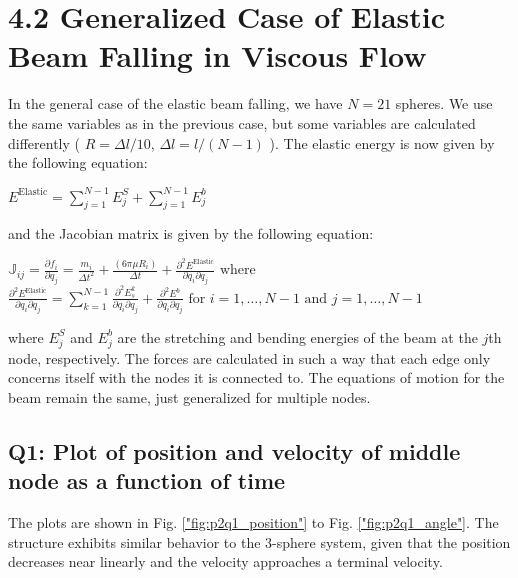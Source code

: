 \documentclass[letterpaper, 10 pt, conference]{ieeeconf}  %
\begin{document}
\section{4.2 Generalized Case of Elastic Beam Falling in Viscous Flow}

In the general case of the elastic beam falling, we have $N = 21$ spheres. We use the same variables as in the previous case, but some variables are calculated differently ( $R = \Delta l / 10$, $\Delta l = l / (N - 1)$ ). The elastic energy is now given by the following equation:

\begin{center}
        $E^{\text{Elastic}} = \sum\limits_{j=1}^{N-1} E^S_j + \sum\limits_{j=1}^{N-1} E^b_j $
\end{center}

and the Jacobian matrix is given by the following equation:

\begin{center}

        $ \mathbb{J}_{ij} = \frac{\partial f_i}{ \partial q_j} = \frac{m_i}{\Delta t^2} + \frac{(6 \pi \mu R_i)}{\Delta t} + \frac{\partial^2 E^{\text{Elastic}}}{\partial q_i \partial q_j }$ 
        $\text{where}$ \\

        $\frac{\partial^2 E^{\text{Elastic}}}{\partial q_i \partial q_j} = \sum\limits_{k=1}^{N-1} \frac{\partial^2 E^k_s}{\partial q_i \partial q_j} + \frac{\partial^2 E^b}{\partial q_i \partial q_j} \text{  for  } i = 1, \dots, {N-1} \text{  and  } j = 1, \dots, {N-1}$
        
\end{center}

where $E^S_j$ and $E^b_j$ are the stretching and bending energies of the beam at the $j$th node, respectively. The forces are calculated in such a way that each edge only concerns itself with the nodes it is connected to. The equations of motion for the beam remain the same, just generalized for multiple nodes.

\subsection*{Q1: Plot of position and velocity of middle node as a function of time}

The plots are shown in Fig. \ref{"fig:p2q1_position"} to Fig. \ref{"fig:p2q1_angle"}. The structure exhibits similar behavior to the 3-sphere system, given that the position decreases near linearly and the velocity approaches a terminal velocity.
\end{document}
